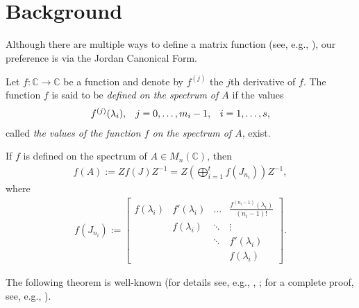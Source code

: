 \documentclass[10pt,twoside,leqno]{siamltex}
\begin{document}
\section{Background}

Although there are multiple ways to define a matrix function (see, e.g., \cite{h2008}), our preference is via the Jordan Canonical Form.

\begin{definition} \label{def:functionvalues}
{\rm Let $f : {\mathbb{{C}}} \longrightarrow {\mathbb{{C}}}$ be a function and denote by $f^{(j)}$ the $j$th derivative of $f$. The function $f$ is said to be \textit{defined on the spectrum of $A$} if the values
\begin{align*}
\begin{array}{c c c}
f^{(j)}(\lambda_i), & j=0,\dots,m_i-1, & i=1,\dots,s,
\end{array}
\end{align*}
called \textit{the values of the function $f$ on the spectrum of $A$}, exist.}
\end{definition}

\begin{definition} 
{\rm If $f$ is defined on the spectrum of $A \in {M_{{n}}({{\mathbb{{C}}}})}$, then
\begin{align*} 
f(A) := Z f(J) {{Z}^{-1}} = Z \left( \bigoplus_{i=1}^t f(J_{n_i}) \right) {{Z}^{-1}}, 
\end{align*}
where
\begin{align}
f(J_{n_i}) := 
\begin{bmatrix} 
f(\lambda_i) & f'(\lambda_i) & \dots   & \frac{f^{(n_i-1)}(\lambda_i)}{(n_i - 1)!} 	\\
	          & f(\lambda_i)  & \ddots & \vdots 						\\
	          &                       & \ddots & f'(\lambda_i)						\\
	          &  	  	   &             & f(\lambda_i)
\end{bmatrix}. \label{fjb}
\end{align}}
\end{definition}

The following theorem is well-known (for details see, e.g., \cite{hj1990}, \cite{lt1985}; for a complete proof, see, e.g., \cite{glr1986}). 
\end{document}
